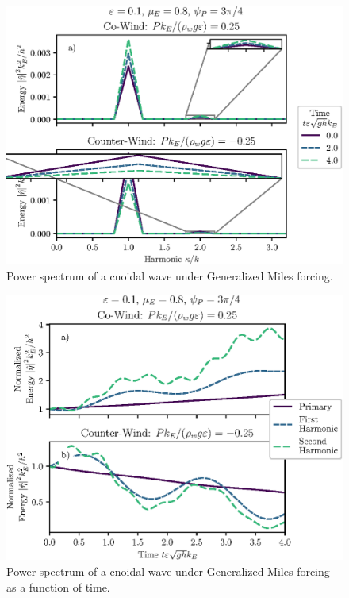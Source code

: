 \documentclass{jfm}
\begin{document}
\begin{figure}
  \centering
  \includegraphics{Power-Spectrum-GM.eps}
  \caption{
    Power spectrum of a cnoidal wave under Generalized Miles forcing.
  }
\end{figure}

\begin{figure}
  \centering
  \includegraphics{Power-Spectrum-vs-Time-GM.eps}
  \caption{
    Power spectrum of a cnoidal wave under Generalized Miles forcing as a
    function of time.
  }
\end{figure}
\end{document}

